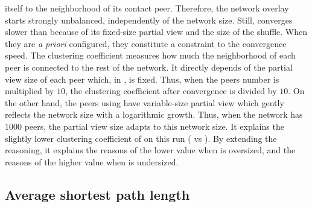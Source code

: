 \begin{asparadesc}
  itself to the neighborhood of its contact peer. Therefore, the network
  overlay starts strongly unbalanced, independently of the network size. Still,
  \CYCLON converges slower than \SPRAY because of its fixed-size partial view
  and the size of the shuffle. When they are \emph{a priori} configured, they
  constitute a constraint to the convergence speed.  The clustering coefficient
  measures how much the neighborhood of each peer is connected to the rest of
  the network. It directly depends of the partial view size of each peer which,
  in \CYCLON, is fixed. Thus, when the peers number is multiplied by $10$, the
  clustering coefficient after convergence is divided by $10$. On the other
  hand, the peers using \SPRAY have variable-size partial view which gently
  reflects the network size with a logarithmic growth. Thus, when the network
  has 1000 peers, the partial view size adapts to this network size. It
  explains the slightly lower clustering coefficient of \SPRAY on this run
  ( vs ). By extending the reasoning, it explains the
  reasons of the \SPRAY lower value when \CYCLON is oversized, and the reasons
  of the \SPRAY higher value when \CYCLON is undersized.
\end{asparadesc}

\subsection{Average shortest path length}
\label{subsec:avg}

